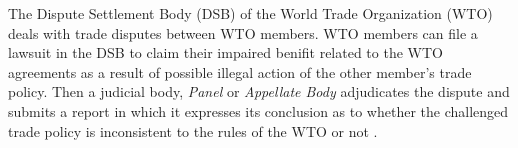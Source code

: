 The Dispute Settlement Body (DSB) of 
the World Trade Organization (WTO) deals 
with trade disputes between WTO members.
WTO members can file a lawsuit in the DSB to 
claim their impaired benifit related to the WTO agreements as a result of possible illegal action of the other member's trade policy.
Then a judicial body, \textit{Panel} or \textit{Appellate Body} %
adjudicates the dispute and submits a report in which it expresses
its conclusion as to whether the challenged 
trade policy is inconsistent to the rules of the WTO or not \citep{world2017handbook}.

 

